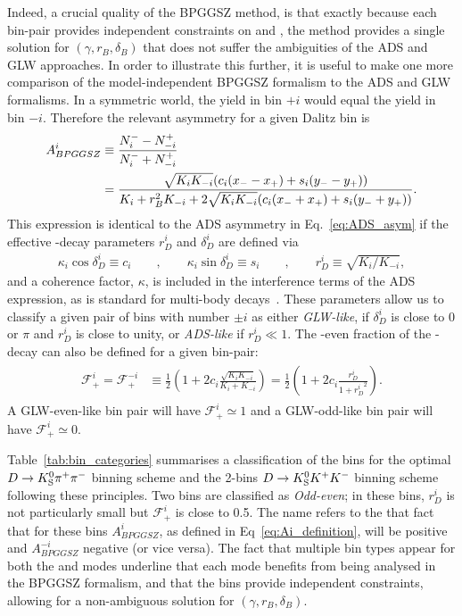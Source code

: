Indeed, a crucial quality of the BPGGSZ method, is that exactly because each bin-pair provides independent constraints on \xpm and \ypm, the method provides a single solution for $(\gamma, r_B, \delta_B)$ that does not suffer the ambiguities of the ADS and GLW approaches. In order to illustrate this further, it is useful to make one more comparison of the model-independent BPGGSZ formalism to the ADS and GLW formalisms. In a \CP symmetric world, the \Bp yield in bin $+i$ would equal the \Bm yield in bin $-i$. Therefore the relevant \CP asymmetry for a given Dalitz bin is
\begin{align}
\begin{split}\label{eq:Ai_definition}
        A_{BPGGSZ}^i &\equiv \frac{N^-_i - N^+_{-i}}{N^-_i + N^+_{-i}} \\
    &= \frac{\sqrt{K_i K_{-i}}(c_i(x_--x_+)+s_i(y_--y_+))}{K_i+r_B^2K_{-i} + 2 \sqrt{K_i K_{-i}}(c_i(x_-+x_+)+s_i(y_-+y_+))}.
\end{split}
\end{align}
This expression is identical to the ADS asymmetry in Eq.~\eqref{eq:ADS_asym} if the effective \D-decay parameters $r_D^i$ and $\delta_D^i$ are defined via
\begin{align}
    \kappa_i\cos\delta_D^i \equiv c_i \qquad, \qquad \kappa_i\sin \delta_D^i \equiv s_i \qquad, \qquad r_D^i \equiv \sqrt{K_i/K_{-i}},
\end{align}
and a coherence factor, $\kappa$, is included in the interference terms of the ADS expression, as is standard for multi-body \D decays~\cite{gronauImprovingBoundsGamma2003}. These parameters allow us to classify a given pair of bins with number $\pm i$ as either \emph{GLW-like}, if $ \delta_D^i$ is close to $0$ or $\pi$ and $r_D^i$  is close to unity, or \emph{ADS-like} if $r_D^i \ll 1$. The \CP-even fraction of the \D-decay can also be defined for a given bin-pair:
\begin{align}
\begin{split}
    \mathcal F_{+}^i = \mathcal F_+^{-i} &\equiv \frac{1}{2}\left(1 + 2c_i \frac{\sqrt{K_i K_{-i}}}{K_i + K_{-i}}\right) = \frac{1}{2}\left(1 + 2c_i \frac{r_D^i}{1+{r_D^i}^2}\right).
\end{split}
\end{align}
A GLW-even-like bin pair will have $\mathcal F_{+}^i\simeq 1$ and a GLW-odd-like bin pair will have $\mathcal F_{+}^i\simeq 0$.

Table~\ref{tab:bin_categories} summarises a classification of the bins for the optimal $D\rightarrow{\ensuremath{{K}^0_{\mathrm{S}}}}{\ensuremath{{\pi}^+}}{\ensuremath{{\pi}^-}}$ binning scheme and the 2-bins ${{D}\rightarrow{\ensuremath{{K}^0_{\mathrm{S}}}}{\ensuremath{{K}^+}}{\ensuremath{{K}^-}}}$ binning scheme following these principles. Two bins are classified as \emph{Odd-even}; in these bins, $r_D^i$ is not particularly small but $\mathcal F_+^i$ is close to 0.5. The name refers to the that fact that for these bins $A_{BPGGSZ}^i$, as defined in Eq~\eqref{eq:Ai_definition}, will be positive and $A_{BPGGSZ}^{-i}$ negative (or vice versa). The fact that multiple bin types appear for both the \DtoKspipi and \DtoKsKK modes underline that each mode benefits from being analysed in the BPGGSZ formalism, and that the bins provide independent constraints, allowing for a non-ambiguous solution for $(\gamma, r_B, \delta_B)$. 

